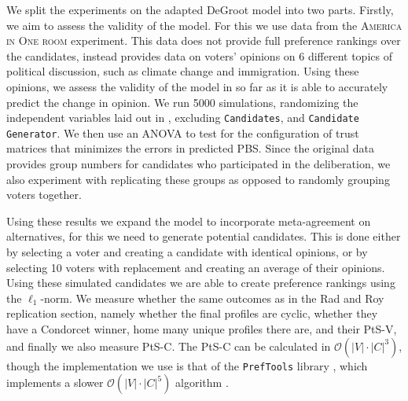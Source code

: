 We split the experiments on the adapted DeGroot model into two parts. Firstly,
we aim to assess the validity of the model. For this we use data from the
\textsc{America in One room} experiment. This data does not provide full
preference rankings over the candidates, instead provides data on voters'
opinions on 6 different topics of political discussion, such as climate change
and immigration. Using these opinions, we assess the validity of the model in
so far as it is able to accurately predict the change in opinion. We run 5000
simulations, randomizing the independent variables laid out in , excluding \texttt{Candidates}, and \texttt{Candidate
	Generator}. We then use an ANOVA to test for the configuration of trust
matrices that minimizes the errors in predicted PBS. Since the original data
provides group numbers for candidates who participated in the deliberation, we
also experiment with replicating these groups as opposed to randomly grouping
voters together.


Using these results we expand the model to incorporate meta-agreement on
alternatives, for this we need to generate potential candidates. This is done
either by selecting a voter and creating a candidate with identical opinions,
or by selecting 10 voters with replacement and creating an average of their
opinions. Using these simulated candidates we are able to create preference
rankings using the $\ell_1$-norm. We measure whether the same outcomes as in the Rad and Roy replication section, namely whether the final profiles are cyclic, whether they have a Condorcet winner, home many unique profiles there
are, and their PtS-V, and finally we also measure PtS-C. The PtS-C can be calculated in
$\mathcal{O}(|V| \cdot{} |C| ^3)$\cite{przedmojskiAlgorithmsExperimentsNearly},
though the implementation we use is that of the \texttt{PrefTools} library
\cite{PrefLibPreflibtools2025}, which implements a slower $\mathcal{O}(|V|
	\cdot{} |C|^5)$ algorithm \cite{erdelyiComputationalAspectsNearly2013}.






